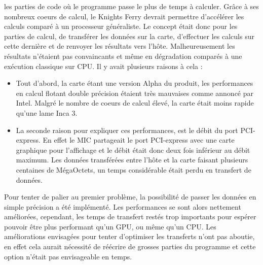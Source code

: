 \documentclass[11pt]{article}
\begin{document}
					les parties de code où le programme passe le plus de temps à calculer. Grâce à ses nombreux coeurs de calcul, 
					le Knights Ferry devrait permettre d'accélérer les calculs comparé à un processeur généraliste. Le concept 
					était donc pour les parties de calcul, de transférer les données sur la carte, d'effectuer les calculs sur 
					cette dernière et de renvoyer les résultats vers l'hôte. Malheureusement les résultats n'étaient pas 
					convaincants et même en dégradation comparés à une exécution classique sur CPU. Il y avait plusieurs raisons 
					à cela : \newline
					\begin{itemize}
					\item Tout d'abord, la carte étant une version Alpha du produit, les performances en calcul flotant 
					double précision étaient très mauvaises comme annoncé par Intel. Malgré le nombre de coeurs de calcul 
					élevé, la carte était moins rapide qu'une lame Inca 3.
					\item La seconde raison pour expliquer ces performances, est le débit du port PCI-express. En effet le MIC 
					partageait le port PCI-express avec une carte graphique pour l'affichage et le débit était donc deux fois 
					inférieur au débit maximum. Les données transférées entre l'hôte et la carte faisant plusieurs 
					centaines de MégaOctets, un temps considérable était perdu en transfert de données. \newline
					\end{itemize}
					Pour tenter de palier au premier problème, la possibilité de passer les données en simple précision a été 
					implémenté. Les performances se sont alors nettement améliorées, cependant, les temps de transfert restés trop 
					importants pour espérer pouvoir être plus performant qu'un GPU, ou même qu'un CPU. \newline
					Les améliorations envisagées pour tenter d'optimiser les transferts n'ont pas aboutie, en effet cela aurait 
					nécessité de réécrire de grosses parties du programme et cette option n'était pas envisageable en temps.
\end{document}
